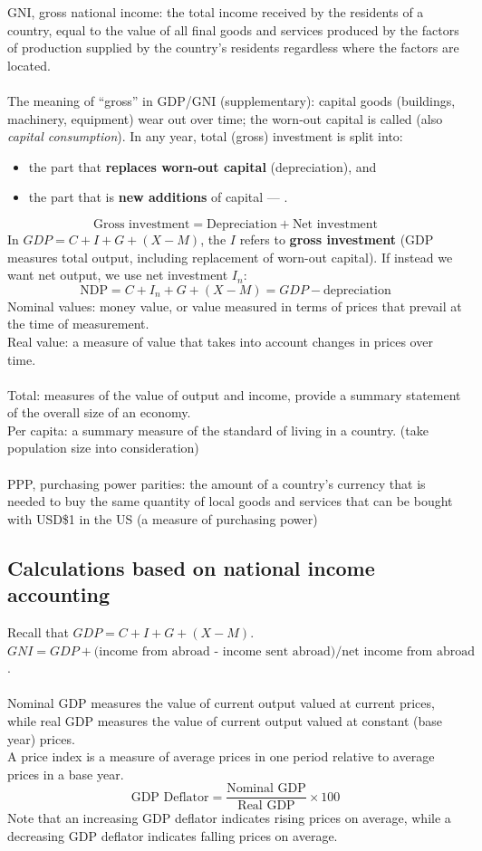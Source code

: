 GNI, gross national income: the total income received by the residents of a country, equal to the value of all final goods and services produced by the factors of production supplied by the country's residents regardless where the factors are located.\\\\
The meaning of ``gross'' in GDP/GNI (supplementary): capital goods (buildings, machinery, equipment) wear out over time; the worn-out capital is called  (also \textit{capital consumption}). In any year, total (gross) investment is split into:
\begin{itemize}
  \item the part that \textbf{replaces worn-out capital} (depreciation), and
  \item the part that is \textbf{new additions} of capital --- .
\end{itemize}
\[\text{Gross investment} = \text{Depreciation} + \text{Net investment}\]
In $GDP = C + I + G + (X - M)$, the $I$ refers to \textbf{gross investment} (GDP measures total output, including replacement of worn-out capital). If instead we want net output, we use net investment $I_n$:
\[\text{NDP} = C + I_n + G + (X - M) = GDP - \text{depreciation}\]
Nominal values: money value, or value measured in terms of prices that prevail at the time of measurement. \\
Real value: a measure of value that takes into account changes in prices over time.\\\\
Total: measures of the value of output and income, provide a summary statement of the overall size of an economy.\\
Per capita: a summary measure of the standard of living in a country. (take population size into consideration)\\\\
PPP, purchasing power parities: the amount of a country's currency that is needed to buy the same quantity of local goods and services that can be bought with USD\$1 in the US (a measure of purchasing power)
\subsection{Calculations based on national income accounting}
Recall that $GDP=C+I+G+(X-M)$. \\
$GNI=GDP + \text{(income from abroad - income sent abroad)} / \text{net income from abroad}$.\\\\
Nominal GDP measures the value of current output valued at current prices, while real GDP measures the value of current output valued at constant (base year) prices.\\
A price index is a measure of average prices in one period relative to average prices in a base year.
\[\text{GDP Deflator}=\dfrac{\text{Nominal GDP}}{\text{Real GDP}}\times 100\]
Note that an increasing GDP deflator indicates rising prices on average, while a decreasing GDP deflator indicates falling prices on average.
